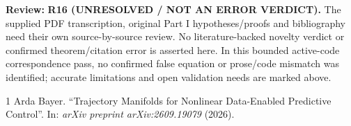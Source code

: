 \documentclass[11pt]{article}
\newcommand{\review}[1]{\par\noindent\textcolor{red!70!black}{\textbf{Review:} #1}\par}
\begin{document}
\review{\textbf{R16 (UNRESOLVED / NOT AN ERROR VERDICT).} The supplied PDF transcription, original Part I hypotheses/proofs and bibliography need their own source-by-source review. No literature-backed novelty verdict or confirmed theorem/citation error is asserted here. In this bounded active-code correspondence pass, no confirmed false equation or prose/code mismatch was identified; accurate limitations and open validation needs are marked above.}
\begin{thebibliography}{1}
 Arda Bayer. ``Trajectory Manifolds for Nonlinear Data-Enabled Predictive Control''. In: \emph{arXiv preprint arXiv:2609.19079} (2026).
\end{thebibliography}
\end{document}
